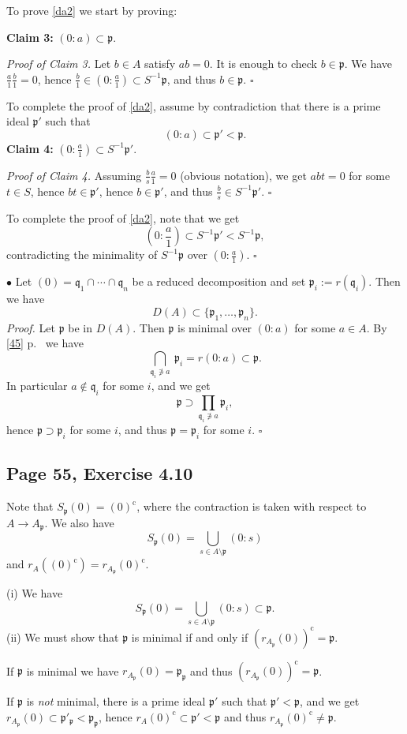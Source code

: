 \documentclass[parskip=half,fontsize=12pt]{scrartcl}%
\newcommand{\oo}{\operatorname}\newcommand{\ooo}{\operatorname*}
\newcommand{\mf}{\mathfrak}
\newcommand{\ppp}{\mf p}
\newcommand{\qqq}{\mf q}
\newcommand{\bu}{\bullet}
\begin{document}
To prove \eqref{da2} we start by proving:

\textbf{Claim 3:} $(0:a)\subset\ppp$.

\emph{Proof of Claim 3.} Let $b\in A$ satisfy $ab=0$. It is enough to check $b\in\ppp$. We have $\frac a1\frac b1=0$, hence $\frac b1\in(0:\frac a1)\subset S^{-1}\ppp$, and thus $b\in\ppp$. $\square$

To complete the proof of \eqref{da2}, assume by contradiction that there is a prime ideal $\ppp'$ such that 
$$
(0:a)\subset\ppp'<\ppp.
$$ 
\textbf{Claim 4:} $(0:\frac a1)\subset S^{-1}\ppp'$.

\emph{Proof of Claim 4.} Assuming $\frac bs\frac a1=0$ (obvious notation), we get $abt=0$ for some $t\in S$, hence $bt\in\ppp'$, hence $b\in\ppp'$, and thus $\frac bs\in S^{-1}\ppp'$. $\square$ 

To complete the proof of \eqref{da2}, note that we get 
$$
\left(0:\frac a1\right)\subset S^{-1}\ppp'<S^{-1}\ppp,
$$ 
contradicting the minimality of $S^{-1}\ppp$ over $(0:\frac a1)$. %
$\square$

$\bu$ Let $(0)=\qqq_1\cap\cdots\cap\qqq_n$ be a reduced decomposition and set $\ppp_i:=r(\qqq_i)$. Then we have 
$$
D(A)\subset\{\ppp_1,\dots,\ppp_n\}.
$$ 
\emph{Proof.} Let $\ppp$ be in $D(A)$. Then $\ppp$ is minimal over $(0:a)$ for some $a\in A$. By \eqref{45} p.~\pageref{45} we have 
$$
\bigcap_{\qqq_i\not\ni a}\ \ppp_i=r(0:a)\subset\ppp.
$$ 
In particular $a\notin\qqq_i$ for some $i$, and we get 
$$
\ppp\supset\prod_{\qqq_i\not\ni a}\ppp_i,
$$ 
hence $\ppp\supset\ppp_i$ for some $i$, and thus $\ppp=\ppp_i$ for some $i$. $\square$

\subsection{Page 55, Exercise 4.10}%

Note that $S_\ppp(0)=(0)^{\oo c}$, where the contraction is taken with respect to $A\to A_\ppp$. We also have 
$$
S_\ppp(0)=\bigcup_{s\in A\setminus\ppp}(0:s)
$$ 
and $r_A((0)^{\oo c})=r_{A_\ppp}(0)^{\oo c}$.

(i) We have 
$$
S_\ppp(0)=\bigcup_{s\in A\setminus\ppp}(0:s)\subset\ppp.
$$
(ii) We must show that $\ppp$ is minimal if and only if $(r_{A_\ppp}(0))^{\oo c}=\ppp$. 

If $\ppp$ is minimal we have $r_{A_\ppp}(0)=\ppp_\ppp$ and thus $(r_{A_\ppp}(0))^{\oo c}=\ppp$. 

If $\ppp$ is \emph{not} minimal, there is a prime ideal $\ppp'$ such that $\ppp'<\ppp$, and we get $r_{A_\ppp}(0)\subset\ppp'_\ppp<\ppp_\ppp$, hence $r_A(0)^{\oo c}\subset\ppp'<\ppp$ and thus $r_{A_\ppp}(0)^{\oo c}\ne\ppp$.
\end{document}
